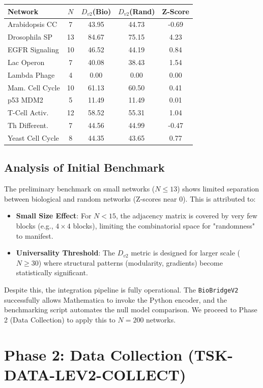 \documentclass[11pt]{article}
\begin{document}
\begin{center}
\begin{tabular}{lcccc}
\toprule
Network & $N$ & $D_{v2}$(Bio) & $D_{v2}$(Rand) & Z-Score \\
\midrule
Arabidopsis CC & 7 & 43.95 & 44.73 & -0.69 \\
Drosophila SP & 13 & 84.67 & 75.15 & 4.23 \\
EGFR Signaling & 10 & 46.52 & 44.19 & 0.84 \\
Lac Operon & 7 & 40.08 & 38.43 & 1.54 \\
Lambda Phage & 4 & 0.00 & 0.00 & 0.00 \\
Mam. Cell Cycle & 10 & 61.13 & 60.50 & 0.41 \\
p53 MDM2 & 5 & 11.49 & 11.49 & 0.01 \\
T-Cell Activ. & 12 & 58.52 & 55.31 & 1.04 \\
Th Different. & 7 & 44.56 & 44.99 & -0.47 \\
Yeast Cell Cycle & 8 & 44.35 & 43.65 & 0.77 \\
\bottomrule
\end{tabular}
\end{center}

\subsection*{Analysis of Initial Benchmark}
The preliminary benchmark on small networks ($N \le 13$) shows limited separation between biological and random networks (Z-scores near 0). This is attributed to:
\begin{itemize}
    \item \textbf{Small Size Effect}: For $N < 15$, the adjacency matrix is covered by very few blocks (e.g., $4 \times 4$ blocks), limiting the combinatorial space for "randomness" to manifest.
    \item \textbf{Universality Threshold}: The $D_{v2}$ metric is designed for larger scale ($N \ge 30$) where structural patterns (modularity, gradients) become statistically significant.
\end{itemize}
Despite this, the integration pipeline is fully operational. The \texttt{BioBridgeV2} successfully allows Mathematica to invoke the Python encoder, and the benchmarking script automates the null model comparison. We proceed to Phase 2 (Data Collection) to apply this to $N=200$ networks.

\section{Phase 2: Data Collection (TSK-DATA-LEV2-COLLECT)}
\end{document}
